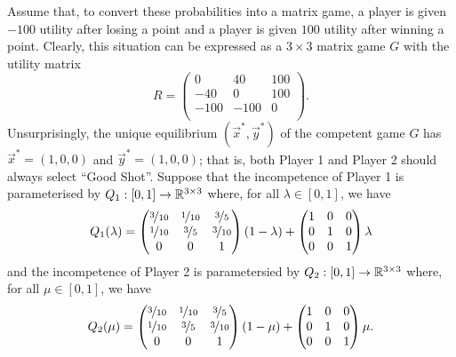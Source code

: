     Assume that, to convert these probabilities into a matrix game, a player is given $-100$ utility after losing a point and a player is given $100$ utility after winning a point.
    Clearly, this situation can be expressed as a $3 \times 3$ matrix game $G$ with the utility matrix
    \[
        R
            =
            \begin{pmatrix}
                0    & 40   & 100 \\
                -40  & 0    & 100 \\
                -100 & -100 & 0   \\
            \end{pmatrix}.
    \]
    Unsurprisingly, the unique equilibrium $(\vec{x}^*, \vec{y}^*)$ of the competent game $G$ has $\vec{x}^* = (1, 0, 0)$ and $\vec{y}^* = (1, 0, 0)$; that is, both Player 1 and Player 2 should always select ``Good Shot''.
    Suppose that the incompetence of Player 1 is parameterised by $Q_1 : [0, 1] \to \mathbb{R}^{3 \times 3}$ where, for all $\lambda \in [0, 1]$, we have
    \[
        Q_1(\lambda)
            =
            \begin{pmatrix}
                \nicefrac{3}{10} & \nicefrac{1}{10} & \nicefrac{3}{5}  \\
                \nicefrac{1}{10} & \nicefrac{3}{5}  & \nicefrac{3}{10} \\
                0 & 0 & 1 \\
            \end{pmatrix}
            (1 - \lambda) +
            \begin{pmatrix}
                1 & 0 & 0 \\
                0 & 1 & 0 \\
                0 & 0 & 1 \\
            \end{pmatrix}
            \lambda
    \]
    and the incompetence of Player 2 is parametersied by $Q_2 : [0, 1] \to \mathbb{R}^{3 \times 3}$ where, for all $\mu \in [0, 1]$, we have
    \[
        Q_2(\mu)
            =
            \begin{pmatrix}
                \nicefrac{3}{10} & \nicefrac{1}{10} & \nicefrac{3}{5}  \\
                \nicefrac{1}{10} & \nicefrac{3}{5}  & \nicefrac{3}{10} \\
                0 & 0 & 1 \\
            \end{pmatrix}
            (1 - \mu) +
            \begin{pmatrix}
                1 & 0 & 0 \\
                0 & 1 & 0 \\
                0 & 0 & 1 \\
            \end{pmatrix}
            \mu.
    \]
